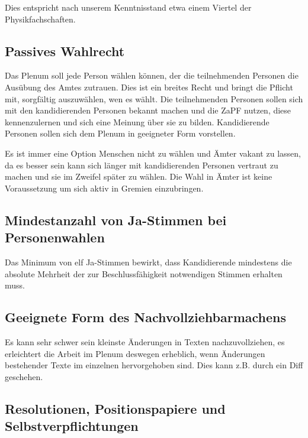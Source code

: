 \documentclass[
  a4paper,
  oneside]{scrartcl}
\begin{document}
Dies entspricht nach unserem Kenntnisstand etwa einem Viertel der
Physikfachschaften.

\subsection*{Passives Wahlrecht}\label{passives-wahlrecht}

Das Plenum soll jede Person wählen können, der die teilnehmenden
Personen die Ausübung des Amtes zutrauen. Dies ist ein breites Recht und
bringt die Pflicht mit, sorgfältig auszuwählen, wen es wählt. Die
teilnehmenden Personen sollen sich mit den kandidierenden Personen
bekannt machen und die ZaPF nutzen, diese kennenzulernen und sich eine
Meinung über sie zu bilden. Kandidierende Personen sollen sich dem
Plenum in geeigneter Form vorstellen.

Es ist immer eine Option Menschen nicht zu wählen und Ämter vakant zu
lassen, da es besser sein kann sich länger mit kandidierenden Personen
vertraut zu machen und sie im Zweifel später zu wählen. Die Wahl in
Ämter ist keine Voraussetzung um sich aktiv in Gremien einzubringen.

\subsection*{Mindestanzahl von Ja-Stimmen bei
Personenwahlen}\label{mindestanzahl-von-ja-stimmen-bei-personenwahlen}

Das Minimum von elf Ja-Stimmen bewirkt, dass Kandidierende mindestens
die absolute Mehrheit der zur Beschlussfähigkeit notwendigen Stimmen
erhalten muss.

\subsection*{Geeignete Form des
Nachvollziehbarmachens}\label{geeignete-form-des-nachvollziehbarmachens}

Es kann sehr schwer sein kleinste Änderungen in Texten nachzuvollziehen,
es erleichtert die Arbeit im Plenum deswegen erheblich, wenn Änderungen
bestehender Texte im einzelnen hervorgehoben sind. Dies kann z.B. durch
ein Diff geschehen.

\subsection*{Resolutionen, Positionspapiere und
Selbstverpflichtungen}\label{resolutionen-positionspapiere-und-selbstverpflichtungen}
\end{document}
